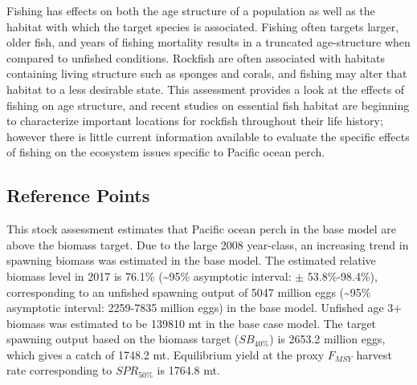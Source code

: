\documentclass[12pt,]{article}
\begin{document}
Fishing has effects on both the age structure of a population as well as
the habitat with which the target species is associated. Fishing often
targets larger, older fish, and years of fishing mortality results in a
truncated age-structure when compared to unfished conditions. Rockfish
are often associated with habitats containing living structure such as
sponges and corals, and fishing may alter that habitat to a less
desirable state. This assessment provides a look at the effects of
fishing on age structure, and recent studies on essential fish habitat
are beginning to characterize important locations for rockfish
throughout their life history; however there is little current
information available to evaluate the specific effects of fishing on the
ecosystem issues specific to Pacific ocean perch.

\subsection*{Reference Points}\label{reference-points}

This stock assessment estimates that Pacific ocean perch in the base
model are above the biomass target. Due to the large 2008 year-class, an
increasing trend in spawning biomass was estimated in the base model.
The estimated relative biomass level in 2017 is 76.1\%
(\textasciitilde{}95\% asymptotic interval: \(\pm\) 53.8\%-98.4\%),
corresponding to an unfished spawning output of 5047 million eggs
(\textasciitilde{}95\% asymptotic interval: 2259-7835 million eggs) in
the base model. Unfished age 3+ biomass was estimated to be 139810 mt in
the base case model. The target spawning output based on the biomass
target (\(SB_{40\%}\)) is 2653.2 million eggs, which gives a catch of
1748.2 mt. Equilibrium yield at the proxy \(F_{MSY}\) harvest rate
corresponding to \(SPR_{50\%}\) is 1764.8 mt.
\end{document}
